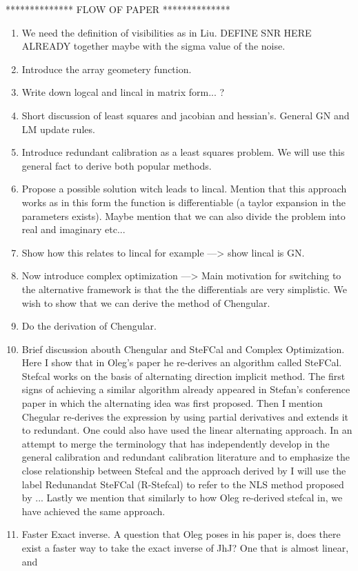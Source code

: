 \documentclass[useAMS,usenatbib]{mn2e}
\begin{document}
 **************
 FLOW OF PAPER
 **************
 
 \begin{enumerate}
 \item We need the definition of visibilities as in Liu. DEFINE SNR HERE ALREADY together maybe with the sigma value of the noise.
 \item Introduce the array geometery function.
 \item Write down logcal and lincal in matrix form... ?
 \item Short discussion of least squares and jacobian and hessian's. General GN and LM update rules.
 \item Introduce redundant calibration as a least squares problem. We will use this general fact to derive both popular methods.
 \item Propose a possible solution witch leads to lincal. Mention that this approach works as in this form the function is differentiable (a taylor expansion in the 
 parameters exists). Maybe mention that we can also divide the problem into real and imaginary etc...
 \item Show how this relates to lincal for example ---> show lincal is GN.
 \item Now introduce complex optimization ---> Main motivation for switching to the alternative framework is that the the differentials are very simplistic. We wish to show that
 we can derive the method of Chengular.
 \item Do the derivation of Chengular. 
 \item Brief discussion abouth Chengular and SteFCal and Complex Optimization. Here I show that in Oleg's paper he re-derives an algorithm called SteFCal. Stefcal works
 on the basis of alternating direction implicit method. The first signs of achieving a similar algorithm already appeared in Stefan's conference paper in which the alternating
 idea was first proposed. Then I mention Chegular re-derives the expression by using partial derivatives and extends it to redundant. One could also have used the linear alternating
 approach. In an attempt to merge the terminology that has independently develop in the general calibration and redundant calibration literature and to emphasize the close
 relationship between Stefcal and the approach derived by I will use the label Redunandat SteFCal (R-Stefcal) to refer to the NLS method proposed by ... Lastly we mention that similarly
 to how Oleg re-derived stefcal in, we have achieved the same approach.
 \item Faster Exact inverse. A question that Oleg poses in his paper is, does there exist a faster way to take the exact inverse of JhJ? One that is almost linear, and

\end{enumerate}
\end{document}
